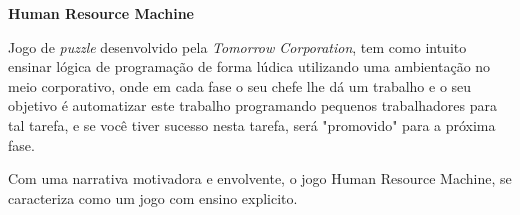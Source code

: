 \item \textbf{Human Resource Machine}

Jogo de \emph{puzzle} desenvolvido pela \emph{Tomorrow Corporation}, tem como
intuito ensinar lógica de programação de forma lúdica utilizando uma
ambientação no meio corporativo, onde em cada fase o seu chefe lhe dá um
trabalho e o seu objetivo é automatizar este trabalho programando pequenos
trabalhadores para tal tarefa, e se você tiver sucesso nesta tarefa, será
"promovido" para a próxima fase.

Com uma narrativa motivadora e envolvente, o jogo Human Resource Machine, se
caracteriza como um jogo com ensino explicito. \cite{HumanResourceMachineSteam}


